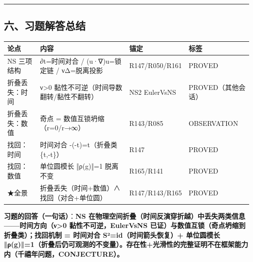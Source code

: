 \documentclass[
]{article}
\newcounter{none} %
\begin{document}
\begin{center}\rule{0.5\linewidth}{0.5pt}\end{center}

\subsection{六、习题解答总结}\label{ux516dux4e60ux9898ux89e3ux7b54ux603bux7ed3}

{\def\LTcaptype{none} %
\begin{longtable}[]{@{}
  >{\raggedright\arraybackslash}p{}
  >{\raggedright\arraybackslash}p{}
  >{\raggedright\arraybackslash}p{}
  >{\raggedright\arraybackslash}p{}@{}}
\toprule\noalign{}
\begin{minipage}[b]{\linewidth}\raggedright
论点
\end{minipage} & \begin{minipage}[b]{\linewidth}\raggedright
内容
\end{minipage} & \begin{minipage}[b]{\linewidth}\raggedright
锚定
\end{minipage} & \begin{minipage}[b]{\linewidth}\raggedright
标签
\end{minipage} \\
\midrule\noalign{}
\endhead
\bottomrule\noalign{}
\endlastfoot
NS 三项结构 & ∂t=时间对合 / (u·∇)u=锁定链 / νΔ=脱离投影 & R147/R050/R161
& PROVED \\
折叠丢失：时间 & ν\textgreater0 黏性不可逆（时间导数翻转/黏性不翻转） &
NS2 EulerVsNS & PROVED（其他会话） \\
折叠丢失：数值 & 奇点 = 数值互锁坍缩（r=0/r→∞） & R143/R085 &
OBSERVATION \\
找回：时间 & 时间对合 -(-t)=t（折叠类 \{t,-t\}） & R147 & PROVED \\
找回：数值 & 单位圆模长 ‖ρ(g)‖=1 脱离不变 & R165/R141 & PROVED \\
★全景 & 折叠丢失（时间+数值）∧ 找回（对合+单位圆） & R147/R143/R165 &
PROVED \\
\end{longtable}
}

\textbf{习题的回答（一句话）}：\textbf{NS
在物理空间折叠（时间反演穿折越）中丢失两类信息------时间方向（ν\textgreater0
黏性不可逆，EulerVsNS 已证）与数值互锁（奇点坍缩到折叠类）；找回机制 =
时间对合 S²=id（时间箭头恢复）+ 单位圆模长
‖ρ(g)‖=1（折叠后仍可观测的不变量）。存在性+光滑性的完整证明不在框架能力内（千禧年问题，CONJECTURE）。}
\end{document}
